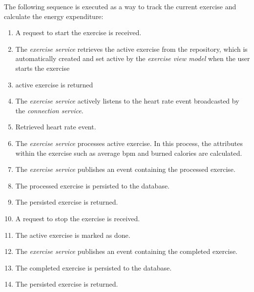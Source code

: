 The following sequence is executed as a way to track the current exercise and calculate the energy expenditure:
\begin{enumerate}
    \item A request to start the exercise is received.
    \item The \emph{exercise service} retrieves the active exercise from the repository, which is automatically created and set active by the \emph{exercise view model} when the user starts the exercise
    \item active exercise is returned
    \item The \emph{exercise service} actively listens to the heart rate event broadcasted by the \emph{connection service}.
    \item Retrieved heart rate event.
    \item The \emph{exercise service} processes active exercise. In this process, the attributes within the exercise such as average bpm and burned calories are calculated.
    \item The \emph{exercise service} publishes an event containing the processed exercise.
    \item The processed exercise is persisted to the database.
    \item The persisted exercise is returned.
    \item A request to stop the exercise is received.
    \item The active exercise is marked as done.
    \item The \emph{exercise service} publishes an event containing the completed exercise.
    \item The completed exercise is persisted to the database.
    \item The persisted exercise is returned.
\end{enumerate}

